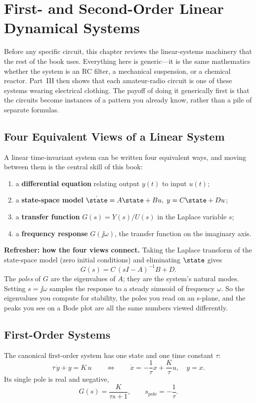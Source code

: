 \chapter{First- and Second-Order Linear Dynamical Systems}
\label{ch:linsys}
Before any specific circuit, this chapter reviews the linear-systems machinery
that the rest of the book uses. Everything here is generic---it is the same
mathematics whether the system is an RC filter, a mechanical suspension, or a
chemical reactor. Part~III then shows that each amateur-radio circuit is one of
these systems wearing electrical clothing. The payoff of doing it generically
first is that the circuits become instances of a pattern you already know, rather
than a pile of separate formulas.

\section{Four Equivalent Views of a Linear System}
A linear time-invariant system can be written four equivalent ways, and moving
between them is the central skill of this book:
\begin{enumerate}
\item a \textbf{differential equation} relating output \(y(t)\) to input \(u(t)\);
\item a \textbf{state-space model} \(\dot{\state}=A\state+Bu,\; y=C\state+Du\);
\item a \textbf{transfer function} \(G(s)=Y(s)/U(s)\) in the Laplace variable
\(s\);
\item a \textbf{frequency response} \(G(\jj\omega)\), the transfer function on the
imaginary axis.
\end{enumerate}

\begin{controlsbox}
\textbf{Refresher: how the four views connect.} Taking the Laplace transform of
the state-space model (zero initial conditions) and eliminating \(\state\) gives
\[
G(s)=C\,(sI-A)^{-1}B+D .
\]
The \emph{poles} of \(G\) are the eigenvalues of \(A\); they are the system's
natural modes. Setting \(s=\jj\omega\) samples the response to a steady sinusoid
of frequency \(\omega\). So the eigenvalues you compute for stability, the poles
you read on an s-plane, and the peaks you see on a Bode plot are all the same
numbers viewed differently.
\end{controlsbox}

\section{First-Order Systems}
The canonical first-order system has one state and one time constant \(\tau\):
\[
\tau\,\dot{y}+y=K\,u
\qquad\Longleftrightarrow\qquad
\dot{x}=-\frac{1}{\tau}x+\frac{K}{\tau}u,\quad y=x .
\]
Its single pole is real and negative,
\[
G(s)=\frac{K}{\tau s+1},
\qquad
s_{\text{pole}}=-\frac{1}{\tau}.
\]


